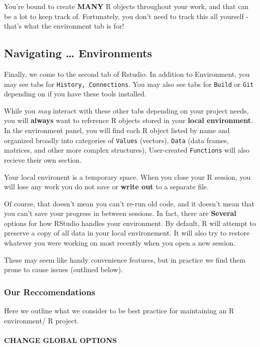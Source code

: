 \documentclass[
]{book}
\begin{document}
You're bound to create \textbf{MANY} R objects throughout your work, and that can be a lot to keep track of. Fortunately, you don't need to track this all yourself - that's what the environment tab is for!

\hypertarget{navigating-environments}{%
\subsection{Navigating \ldots{} Environments}\label{navigating-environments}}

Finally, we come to the second tab of Rstudio. In addition to Environment, you may see tabs for \texttt{History,\ Connections}. You may also see tabs for \texttt{Build} or \texttt{Git} depending on if you have these tools installed.

While you \emph{may} interact with these other tabs depending on your project needs, you will \textbf{always} want to reference R objects stored in your \textbf{local environment}. In the environment panel, you will find each R object listed by name and organized broadly into categories of \texttt{Values} (vectors), \texttt{Data} (data frames, matrices, and other more complex structures), User-created \texttt{Functions} will also recieve their own section.

Your local environent is a temporary space. When you close your R session, you will lose any work you do not save or \textbf{write out} to a separate file.

Of course, that doesn't mean you can't re-run old code, and it doesn't mean that you can't save your progress in between sessions. In fact, there are \textbf{Several} options for how RStudio handles your environment. By default, R will attempt to preserve a copy of all data in your local environement. It will also try to restore whatever you were working on most recently when you open a new session.

These may seem like handy convenience features, but in practice we find them prone to cause issues (outlined below).

\hypertarget{our-reccomendations}{%
\subsubsection{Our Reccomendations}\label{our-reccomendations}}

Here we outline what we consider to be best practice for maintaining an R environment/ R project.

\hypertarget{change-global-options}{%
\paragraph{CHANGE GLOBAL OPTIONS}\label{change-global-options}}
\end{document}

